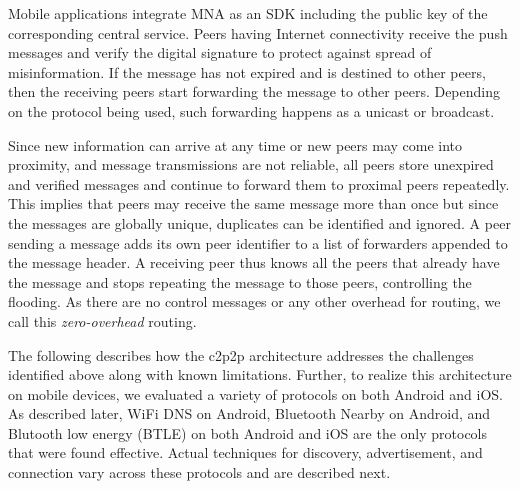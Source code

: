\documentclass[conference]{IEEEtran}
\begin{document}
Mobile applications integrate MNA as an SDK including the public key
of the corresponding central service. Peers having Internet
connectivity receive the push messages and verify the digital
signature to protect against spread of misinformation.  If the message
has not expired and is destined to other peers, then the receiving
peers start forwarding the message to other peers. Depending on the
protocol being used, such forwarding happens as a unicast or
broadcast.

Since new information can arrive at any time or new peers may come
into proximity, and message transmissions are not reliable, all peers
store unexpired and verified messages and continue to forward them to
proximal peers repeatedly. This implies that peers may receive the
same message more than once but since the messages are globally
unique, duplicates can be identified and ignored.  A peer sending a
message adds its own peer identifier to a list of forwarders appended
to the message header.  A receiving peer thus knows all the peers that
already have the message and stops repeating the message to those
peers, controlling the flooding.  As there are no control messages or
any other overhead for routing, we call this \emph{zero-overhead}
routing.

The following describes how the c2p2p architecture addresses the
challenges identified above along with known limitations. Further, to
realize this architecture on mobile devices, we evaluated a variety of
protocols on both Android and iOS. As described later, WiFi DNS on
Android, Bluetooth Nearby on Android, and Blutooth low energy (BTLE)
on both Android and iOS are the only protocols that were found
effective. Actual techniques for discovery, advertisement, and
connection vary across these protocols and are described next.
%
\end{document}
